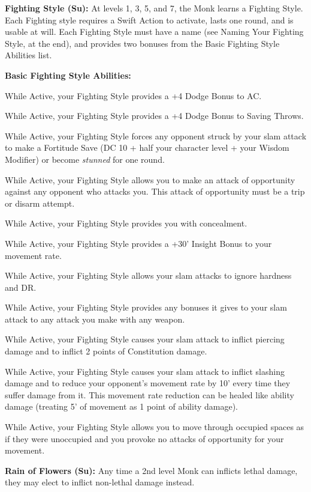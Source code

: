 \textbf{Fighting Style (Su):} At levels 1, 3, 5, and 7, the Monk learns a Fighting Style. Each Fighting style requires a Swift Action to activate, lasts one round, and is usable at will. Each Fighting Style must have a name (see Naming Your Fighting Style, at the end), and provides two bonuses from the Basic Fighting Style Abilities list.

\textbf{Basic Fighting Style Abilities:}
\begin{itemize*}
\item While Active, your Fighting Style provides a +4 Dodge Bonus to AC.
\item While Active, your Fighting Style provides a +4 Dodge Bonus to Saving Throws.
\item While Active, your Fighting Style forces any opponent struck by your slam attack to make a Fortitude Save (DC 10 + half your character level + your Wisdom Modifier) or become \textit{stunned} for one round.
\item While Active, your Fighting Style allows you to make an attack of opportunity against any opponent who attacks you. This attack of opportunity must be a trip or disarm attempt.
\item While Active, your Fighting Style provides you with concealment.
\item While Active, your Fighting Style provides a +30' Insight Bonus to your movement rate.
\item While Active, your Fighting Style allows your slam attacks to ignore hardness and DR.
\item While Active, your Fighting Style provides any bonuses it gives to your slam attack to any attack you make with any weapon.
\item While Active, your Fighting Style causes your slam attack to inflict piercing damage and to inflict 2 points of Constitution damage.
\item While Active, your Fighting Style causes your slam attack to inflict slashing damage and to reduce your opponent's movement rate by 10' every time they suffer damage from it. This movement rate reduction can be healed like ability damage (treating 5' of movement as 1 point of ability damage).
\item While Active, your Fighting Style allows you to move through occupied spaces as if they were unoccupied and you provoke no attacks of opportunity for your movement.
\end{itemize*}

\textbf{Rain of Flowers (Su):} Any time a 2nd level Monk can inflicts lethal damage, they may elect to inflict non-lethal damage instead.

